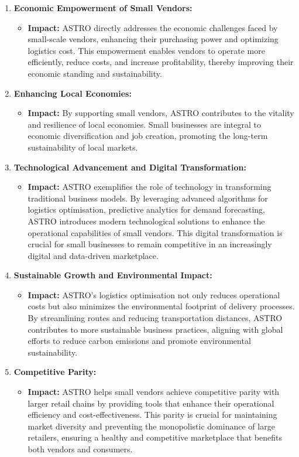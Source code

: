 \begin{enumerate}
	\item \textbf{Economic Empowerment of Small Vendors:}
	      \begin{itemize}
		      \item \textbf{Impact:} ASTRO directly addresses the economic challenges faced by small-scale vendors, enhancing their purchasing power and optimizing logistics cost. This empowerment enables vendors to operate more efficiently, reduce costs, and increase profitability, thereby improving their economic standing and sustainability.
	      \end{itemize}

	\item \textbf{Enhancing Local Economies:}
	      \begin{itemize}
		      \item \textbf{Impact:} By supporting small vendors, ASTRO contributes to the vitality and resilience of local economies. Small businesses are integral to economic diversification and job creation, promoting the long-term sustainability of local markets.
	      \end{itemize}

	\item \textbf{Technological Advancement and Digital Transformation:}
	      \begin{itemize}
		      \item \textbf{Impact:} ASTRO exemplifies the role of technology in transforming traditional business models. By leveraging advanced algorithms for logistics optimisation, predictive analytics for demand forecasting, ASTRO introduces modern technological solutions to enhance the operational capabilities of small vendors. This digital transformation is crucial for small businesses to remain competitive in an increasingly digital and data-driven marketplace.
	      \end{itemize}

	\item \textbf{Sustainable Growth and Environmental Impact:}
	      \begin{itemize}
		      \item \textbf{Impact:} ASTRO’s logistics optimisation not only reduces operational costs but also minimizes the environmental footprint of delivery processes. By streamlining routes and reducing transportation distances, ASTRO contributes to more sustainable business practices, aligning with global efforts to reduce carbon emissions and promote environmental sustainability.
	      \end{itemize}
	\item \textbf{Competitive Parity:}
	      \begin{itemize}
		      \item \textbf{Impact:} ASTRO helps small vendors achieve competitive parity with larger retail chains by providing tools that enhance their operational efficiency and cost-effectiveness. This parity is crucial for maintaining market diversity and preventing the monopolistic dominance of large retailers, ensuring a healthy and competitive marketplace that benefits both vendors and consumers.
	      \end{itemize}


\end{enumerate}

